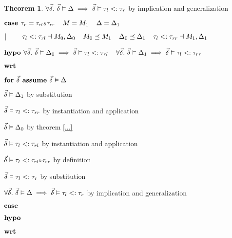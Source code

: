 \documentclass[acmsmall]{acmart}
\theoremstyle{definition}
\newtheorem{theorem}{Theorem}[section]
\begin{document}
\begin{theorem}
      \item \Z\Z $\forall \vec{\delta} .\ \vec{\delta} \vDash \Delta \implies \vec{\delta} \vDash \tau_l <: \tau_r$ 
      by implication and generalization

    \item \Z $\B{case } 
      \tau_r = \J{$\tau_{rl}$\&$\tau_{rr}$}
      \I
      M = M_1
      \I
      \Delta = \Delta_1
    $
    \item \Z $|\ \ \ \ \ \ \  
      \tau_l <: \tau_{rl} \dashv M_0, \Delta_0
      \hspace{4mm}
      M_0 \preceq M_1
      \hspace{4mm}
      \Delta_0 \preceq \Delta_1
      \hspace{4mm}
      \tau_l <: \tau_{rr} \dashv M_1, \Delta_1
    $
    \item \Z $\textbf{hypo } 
      \forall \vec{\delta} .\ \vec{\delta} \vDash \Delta_0 \implies \vec{\delta} \vDash \tau_l <: \tau_{rl} 
      \hspace{4mm}
      \forall \vec{\delta} .\ \vec{\delta} \vDash \Delta_1 \implies \vec{\delta} \vDash \tau_l <: \tau_{rr} 
    $
    \item \Z $\textbf{wrt } $
      \item \Z\Z $\textbf{for } \vec{\delta} \textbf{ assume } \vec{\delta} \vDash \Delta$
        \item \Z\Z\Z $\vec{\delta} \vDash \Delta_1 $ by substitution
        \item \Z\Z\Z $\vec{\delta} \vDash \tau_l <: \tau_{rr}$ by instantiation and application 
        \item \Z\Z\Z $\vec{\delta} \vDash \Delta_0 $ by theorem \ref{...}  
        \item \Z\Z\Z $\vec{\delta} \vDash \tau_l <: \tau_{rl}$ by instantiation and application 
        \item \Z\Z\Z $\vec{\delta} \satisfies \tau_l \subtypes \J{$\tau_{rl}$\&$\tau_{rr}$}$ by definition 
        \item \Z\Z\Z $\vec{\delta} \vDash \tau_l <: \tau_r$ by substitution
      \item \Z\Z $\forall \vec{\delta} .\ \vec{\delta} \vDash \Delta \implies \vec{\delta} \vDash \tau_l <: \tau_r$ 
      by implication and generalization


    \item \Z $\textbf{case } $
    \item \Z $\textbf{hypo } $
    \item \Z $\textbf{wrt } $
      \item \Z\Z {} 


\end{theorem}
\end{document}
